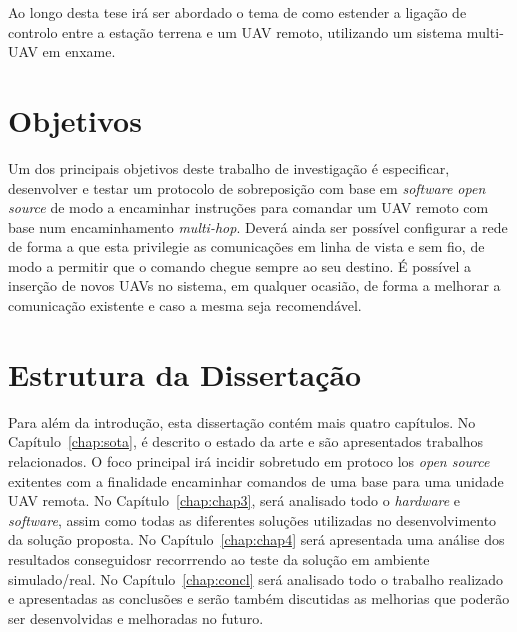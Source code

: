   Ao longo desta tese irá ser abordado o tema de como estender a ligação de controlo entre a estação terrena e um UAV remoto, utilizando um sistema multi-UAV em enxame.
  
\section{Objetivos}\label{sec:goals}

Um dos principais objetivos deste trabalho de investigação é especificar, desenvolver e testar um protocolo de sobreposição com base em \textit{software open source} de modo a encaminhar instruções para comandar um UAV remoto com base num encaminhamento \textit{multi-hop}. Deverá ainda ser possível configurar a rede de forma a que esta privilegie as comunicações em linha de vista e sem fio, de modo a permitir que o comando chegue sempre ao seu destino. É possível  a inserção de novos UAVs no sistema, em qualquer ocasião, de forma a melhorar a comunicação existente e caso a mesma seja recomendável.

\section{Estrutura da Dissertação}\label{sec:struct}

Para além da introdução, esta dissertação contém mais quatro capítulos.
No Capítulo~\ref{chap:sota}, é descrito o estado da arte e são
apresentados trabalhos relacionados. O foco principal irá incidir sobretudo em protoco los \textit{open source} exitentes com a finalidade encaminhar comandos de uma base para uma unidade UAV remota.
No Capítulo~\ref{chap:chap3}, será analisado todo o \textit{hardware} e \textit{software}, assim como todas as diferentes soluções utilizadas no desenvolvimento da solução proposta.
No Capítulo~\ref{chap:chap4} será apresentada uma análise dos resultados conseguidosr recorrrendo ao teste da solução em ambiente simulado/real. 
No Capítulo~\ref{chap:concl} será analisado todo o trabalho realizado e apresentadas as conclusões e serão também discutidas as melhorias que poderão ser desenvolvidas e melhoradas no futuro.

